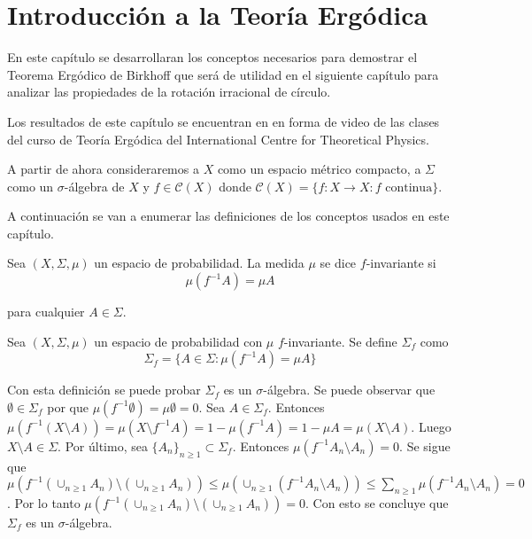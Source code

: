 \chapter{Introducción a la Teoría Ergódica}

En este capítulo se desarrollaran los conceptos necesarios para  demostrar el Teorema Ergódico de Birkhoff que será de utilidad en el siguiente capítulo para analizar las propiedades de la rotación irracional de círculo.

Los resultados de este capítulo se encuentran en \cite{youtube} en forma de video de las clases del curso de Teoría Ergódica del International Centre for Theoretical Physics.

A partir de ahora consideraremos a $X$ como un espacio métrico compacto, a $\Sigma$ como un $\sigma$-álgebra de $X$ y $f \in \mathcal{C}(X)$ donde $\mathcal{C}(X) = \{f: X \rightarrow X: f \text{ continua}\}$.

A continuación se van a enumerar las definiciones de los conceptos usados en este capítulo.

\begin{definicion}
	Sea $(X,\Sigma,\mu)$ un espacio de probabilidad. La medida $\mu$ se dice $f$-invariante si	
	\begin{equation}
		\mu(f^{-1}A) = \mu A
	\end{equation}
	
	para cualquier $A \in \Sigma$.
\end{definicion}

\begin{definicion}
	Sea $(X,\Sigma,\mu)$ un espacio de probabilidad  con $\mu$ $f$-invariante. Se define $\Sigma_f$ como	
	\begin{equation}
		\Sigma_f = \{ A \in \Sigma: \mu(f^{-1}A) = \mu A \}
	\end{equation}
\end{definicion}

Con esta definición se puede probar $\Sigma_f$ es un $\sigma$-álgebra. Se puede observar que $\emptyset \in \Sigma_f$ por que $\mu(f^{-1} \emptyset) = \mu \emptyset = 0$. Sea $A \in \Sigma_f$. Entonces $\mu(f^{-1}(X \setminus A)) =  \mu(X \setminus f^{-1}A) = 1 - \mu(f^{-1}A) = 1 - \mu A = \mu(X \setminus A)$. Luego $X \setminus A \in \Sigma$. Por último, sea $\{A_n\}_{n \geq 1} \subset \Sigma_f$. Entonces $\mu(f^{-1}A_n \setminus A_n) = 0$. Se sigue que $\mu(f^{-1}(\cup_{n \geq 1} A_n) \setminus (\cup_{n \geq 1} A_n)) \leq \mu(\cup_{n \geq 1} (f^{-1}A_n \setminus A_n)) \leq \sum_{n \geq 1} \mu(f^{-1}A_n \setminus A_n) = 0$. Por lo tanto $\mu(f^{-1}(\cup_{n \geq 1} A_n) \setminus (\cup_{n \geq 1} A_n)) = 0$. Con esto se concluye que $\Sigma_f$ es un $\sigma$-álgebra. 

